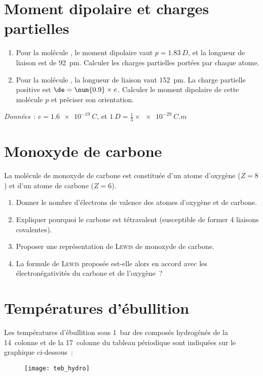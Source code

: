 \documentclass[a4paper, 12pt, final, garamond]{book}
\begin{document}
\section{Moment dipolaire et charges partielles}
\begin{enumerate}
    \item Pour la molécule , le moment dipolaire vaut $p = \SI{1.83}{D}$,
        et la longueur de liaison est de \SI{92}{pm}. Calculer les charges
        partielles portées par chaque atome.
    \item Pour la molécule , la longueur de liaison vaut \SI{152}{pm}.
        La charge partielle positive est $\de = \num{0.9}\times e$. Calculer le
        moment dipolaire de cette molécule $p$ et préciser son orientation.
\end{enumerate}
\textit{Données}~: $e = \SI{1.6e-19}{C}$, et $\SI{1}{D} =
\frac{1}{3}\times\SI{e-29}{C.m}$

\section{Monoxyde de carbone}
La molécule de monoxyde de carbone est constituée d'un atome d'oxygène ($Z = 8$)
et d'un atome de carbone ($Z=6$). \bigbreak

\begin{enumerate}
    \item Donner le nombre d'électrons de valence des atomes d'oxygène et de
        carbone.
    \item Expliquer pourquoi le carbone est tétravalent (susceptible de former 4
        liaisons covalentes).
    \item Proposer une représentation de \textsc{Lewis} de monoxyde de carbone.
    \item La formule de \textsc{Lewis} proposée est-elle alors en accord avec
        les électronégativités du carbone et de l'oxygène~?
\end{enumerate}

\section{Températures d'ébullition}
Les températures d'ébullition sous \SI{1}{bar} des composés hydrogénés de la
14\ieme\ colonne et de la 17\ieme\ colonne du tableau périodique sont indiquées
sur le graphique ci-dessous~:

\begin{figure}[]
    \centering
    \texttt{[image: teb\_hydro]}
    \label{fig:tebhydro}
\end{figure}
\end{document}
